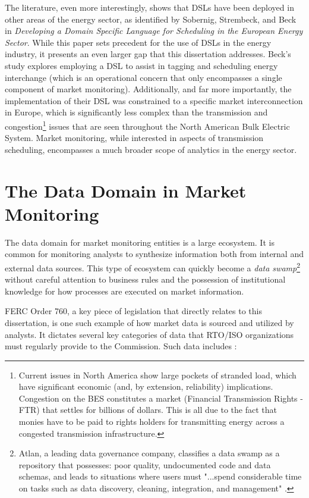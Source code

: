 The literature, even more interestingly, shows that DSLs have been deployed in other areas of the energy sector, as identified by Sobernig, Strembeck, and Beck \cite{beck} in \textit{Developing a Domain Specific Language for Scheduling in the European Energy Sector}. While this paper sets precedent for the use of DSLs in the energy industry, it presents an even larger gap that this dissertation addresses. Beck's study explores employing a DSL to assist in tagging and scheduling energy interchange (which is an operational concern that only encompasses a single component of market monitoring). Additionally, and far more importantly, the implementation of their DSL was constrained to a specific market interconnection in Europe, which is significantly less complex than the transmission and congestion\footnote{Current issues in North America show large pockets of stranded load, which have significant economic (and, by extension, reliability) implications. Congestion on the BES constitutes a market (Financial Transmission Rights - FTR) that settles for billions of dollars. This is all due to the fact that monies have to be paid to rights holders for transmitting energy across a congested transmission infrastructure.}
issues that are seen throughout the North American Bulk Electric System. Market monitoring, while interested in aspects of transmission scheduling, encompasses a much broader scope of analytics in the energy sector. 

\section{The Data Domain in Market Monitoring}

The data domain for market monitoring entities is a large ecosystem. It is common for monitoring analysts to synthesize information both from internal and external data sources. This type of ecosystem can quickly become a \textit{data swamp}\footnote{Atlan, a leading data governance company, classifies a data swamp as a repository that possesses: poor quality, undocumented code and data schemas, and leads to situations where users must "...spend considerable time on tasks such as data discovery, cleaning, integration, and management" \cite{atlan-data-swamp}.} without careful attention to business rules and the possession of institutional knowledge for how processes are executed on market information.

FERC Order 760, a key piece of legislation that directly relates to this dissertation, is one such example of how market data is sourced and utilized by analysts. It dictates several key categories of data that RTO/ISO organizations must regularly provide to the Commission. Such data includes \cite{daignault}:

